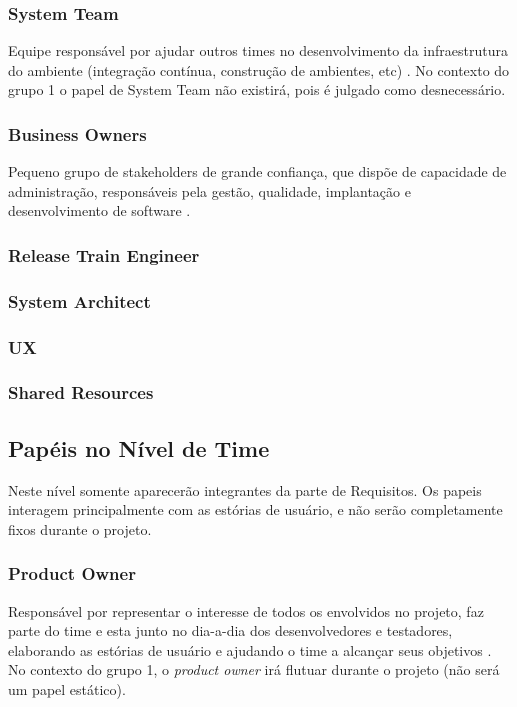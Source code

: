 \subsubsection{System Team}
Equipe responsável por ajudar outros times no desenvolvimento da infraestrutura do ambiente (integração contínua, construção de ambientes, etc) \cite{safesite001}. No contexto do grupo 1 o papel de System Team não existirá, pois é julgado como desnecessário.

\subsubsection{Business Owners}
Pequeno grupo de stakeholders de grande confiança, que dispõe de capacidade de administração, responsáveis pela gestão, qualidade, implantação e desenvolvimento de software \cite{safesite001}.

\subsubsection{Release Train Engineer}
\subsubsection{System Architect}
\subsubsection{UX}
\subsubsection{Shared Resources}

\subsection{Papéis no Nível de Time}
Neste nível somente aparecerão integrantes da parte de Requisitos. Os papeis interagem principalmente com as estórias de usuário, e não serão completamente fixos durante o projeto.

\subsubsection{Product Owner}
Responsável por representar o interesse de todos os envolvidos no projeto, faz parte do time e esta junto no dia-a-dia dos desenvolvedores e testadores, elaborando as estórias de usuário e ajudando o time a alcançar seus objetivos \cite{safe001}. No contexto do grupo 1, o \emph{product owner} irá flutuar durante o projeto (não será um papel estático).

